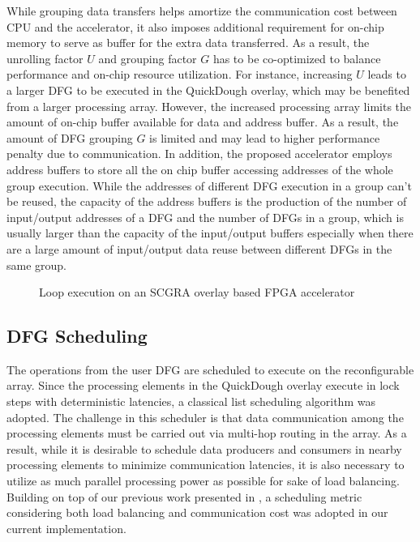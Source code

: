 While grouping data transfers helps amortize the communication cost between CPU and the accelerator, it also imposes additional requirement for on-chip memory to serve as buffer for the extra data transferred. As a result, the unrolling factor $U$ and grouping factor $G$ has to be co-optimized to balance performance and on-chip resource utilization. For instance, increasing $U$ leads to a larger DFG to be executed in the QuickDough overlay, which may be benefited from a larger processing array. However, the increased processing array limits the amount of on-chip buffer available for data and address buffer. As a result, the amount of DFG grouping $G$ is limited and may lead to higher performance penalty due to communication. In addition, the proposed accelerator employs address buffers to store all the on chip buffer accessing addresses of the whole group execution. While the addresses of different DFG execution in a group can't be reused, the capacity of the address buffers is the production of the number of input/output addresses of a DFG and the number of DFGs in a group, which is usually larger than the capacity of the input/output buffers especially when there are a large amount of input/output data reuse between different DFGs in the same group. 

\begin{figure}
\caption{Loop execution on an SCGRA overlay based FPGA accelerator}
\label{fig:blocking-and-dfg-gen}
\end{figure}

\subsection{DFG Scheduling}
The operations from the user DFG are scheduled to execute on the reconfigurable array. Since the processing elements in the QuickDough overlay execute in lock steps with deterministic latencies, a classical list scheduling algorithm \cite{schutten1996list} was adopted. The challenge in this scheduler is that data communication among the processing elements must be carried out via multi-hop routing in the array. As a result, while it is desirable to schedule data producers and consumers in nearby processing elements to minimize communication latencies, it is also necessary to utilize as much parallel processing power as possible for sake of load balancing. Building on top of our previous work presented in \cite{lin2012energy}, a scheduling metric considering both load balancing and communication cost was adopted in our current implementation.

